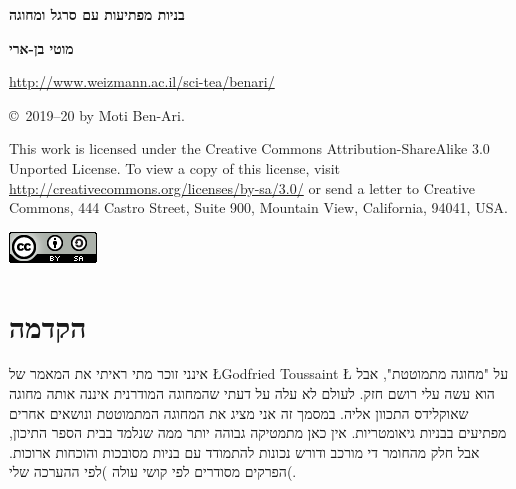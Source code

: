 

\thispagestyle{empty}

\begin{center}
\textbf{\LARGE בניות מפתיעות עם סרגל ומחוגה}

\bigskip
\bigskip
\bigskip
\bigskip

\textbf{\Large מוטי בן-ארי}

\bigskip
\bigskip

\url{http://www.weizmann.ac.il/sci-tea/benari/}
\end{center}



\vfill


\begin{footnotesize}
\begin{center}
\copyright{}\ 2019--20 by Moti Ben-Ari.
\end{center}

This work is licensed under the Creative Commons Attribution-ShareAlike 3.0 Unported License. To view a copy of this license, visit \url{http://creativecommons.org/licenses/by-sa/3.0/} or send a letter to Creative Commons, 444 Castro Street, Suite 900, Mountain View, California, 94041, USA.
\end{footnotesize}

\bigskip

\begin{center}
\includegraphics[width=.15\textwidth]{../../by-sa.png}
\end{center}

\np
\thispagestyle{empty}
\mbox{}
\np
\thispagestyle{empty}

\tableofcontents
\np
\mbox{}
\np

\section*{הקדמה}

אינני זוכר מתי ראיתי את המאמר של 
\L{Godfried Toussaint}
\L{\cite{toussaint}}
על "מחוגה מתמוטטת", אבל הוא עשה עלי רושם חזק. לעולם לא עלה על דעתי שהמחוגה המודרנית איננה אותה מחוגה שאוקלידס התכוון אליה. במסמך זה אני מציג את המחוגה המתמוטטת ונושאים אחרים מפתיעים בבניות גיאומטריות. אין כאן מתמטיקה גבוהה יותר ממה שנלמד בבית הספר התיכון, אבל חלק מהחומר די מורכב ודורש נכונות להתמודד עם בניות מסובכות והוכחות ארוכות. הפרקים מסודרים לפי קושי עולה )לפי ההערכה שלי(.


